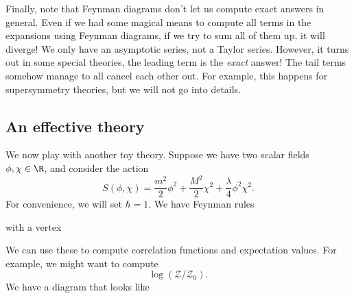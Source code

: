 \documentclass[a4paper]{article}
\begin{document}
Finally, note that Feynman diagrams don't let us compute exact answers in general. Even if we had some magical means to compute all terms in the expansions using Feynman diagrams, if we try to sum all of them up, it will diverge! We only have an asymptotic series, not a Taylor series. However, it turns out in some special theories, the leading term is the \emph{exact} answer! The tail terms somehow manage to all cancel each other out. For example, this happens for supersymmetry theories, but we will not go into details.

\subsection{An effective theory}
We now play with another toy theory. Suppose we have two scalar fields $\phi, \chi \in \R$, and consider the action
\[
  S(\phi, \chi) = \frac{m^2}{2}\phi^2 + \frac{M^2}{2} \chi^2 + \frac{\lambda}{4} \phi^2 \chi^2.
\]
For convenience, we will set $\hbar = 1$. We have Feynman rules
\begin{center}
  \quad\quad
\end{center}
with a vertex
\begin{center}
\end{center}
We can use these to compute correlation functions and expectation values. For example, we might want to compute
\[
  \log (\mathcal{Z}/\mathcal{Z}_0).
\]
We have a diagram that looks like
\end{document}
